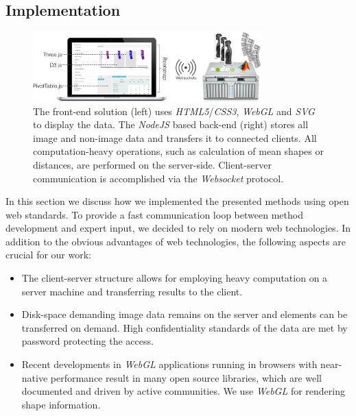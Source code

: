 \documentclass[journal]{style/vgtc} 			          %
\begin{document}
\subsection{Implementation} \label{implementation}
\begin{figure}[htb]
 \centering
 \label{fig:technologies}
 \includegraphics[width=3.5in]{figures/technologies}
 \caption{The front-end solution (left) uses \emph{HTML5}/\emph{CSS3}, \emph{WebGL} and \emph{SVG} to display the data.
 The \emph{NodeJS} based back-end (right) stores all image and non-image data and transfers it to connected clients.
 All computation-heavy operations, such as calculation of mean shapes or distances, are performed on the server-side. 
 Client-server communication is accomplished via the \emph{Websocket} protocol.
 }
\end{figure}
In this section we discuss how we implemented the presented methods using open web standards.
%
To provide a fast communication loop between method development and expert input, we decided to rely on modern web technologies.
%
In addition to the obvious advantages of web technologies, the following aspects are crucial for our work:
\begin{itemize} %
	\item The client-server structure allows for employing heavy computation on a server machine and transferring results to the client.
	\item Disk-space demanding image data remains on the server and elements can be transferred on demand.
	High confidentiality standards of the data are met by password protecting the access.%
	\item Recent developments in \emph{WebGL} applications running in browsers with near-native performance result in many open source libraries, which are well documented and driven by active communities. We use \emph{WebGL} for rendering shape information.
\end{itemize}
\end{document}
